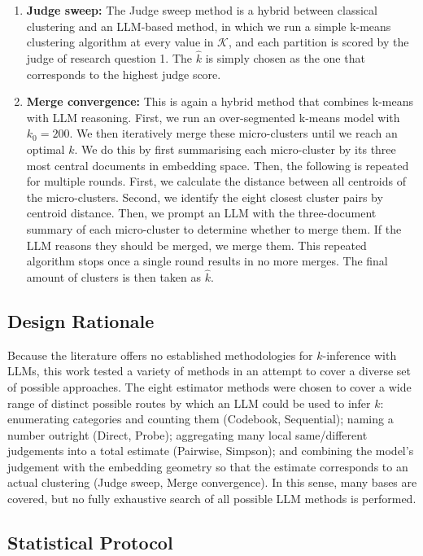 \documentclass[11pt,a4paper,oneside]{report}
\begin{document}
\begin{enumerate}
\item \textbf{Judge sweep:} The Judge sweep method is a hybrid between classical clustering and an LLM-based method, in which we run a simple k-means clustering algorithm at every value in $\mathcal{K}$, and each partition is scored by the judge of research question 1. The $\hat{k}$ is simply chosen as the one that corresponds to the highest judge score.
\item \textbf{Merge convergence:} This is again a hybrid method that combines k-means with LLM reasoning. First, we run an over-segmented k-means model with $k_0 = 200$. We then iteratively merge these micro-clusters until we reach an optimal $k$. We do this by first summarising each micro-cluster by its three most central documents in embedding space. Then, the following is repeated for multiple rounds. First, we calculate the distance between all centroids of the micro-clusters. Second, we identify the eight closest cluster pairs by centroid distance. Then, we prompt an LLM with the three-document summary of each micro-cluster to determine whether to merge them. If the LLM reasons they should be merged, we merge them. This repeated algorithm stops once a single round results in no more merges. The final amount of clusters is then taken as $\hat{k}$.
\end{enumerate}

\subsection{Design Rationale}

Because the literature offers no established methodologies for $k$-inference with LLMs, this work tested a variety of methods in an attempt to cover a diverse set of possible approaches. The eight estimator methods were chosen to cover a wide range of distinct possible routes by which an LLM could be used to infer $k$: enumerating categories and counting them (Codebook, Sequential); naming a number outright (Direct, Probe); aggregating many local same/different judgements into a total estimate (Pairwise, Simpson); and combining the model's judgement with the embedding geometry so that the estimate corresponds to an actual clustering (Judge sweep, Merge convergence). In this sense, many bases are covered, but no fully exhaustive search of all possible LLM methods is performed.

\subsection{Statistical Protocol} \label{sec:RQ2_STATPROT}
\end{document}
